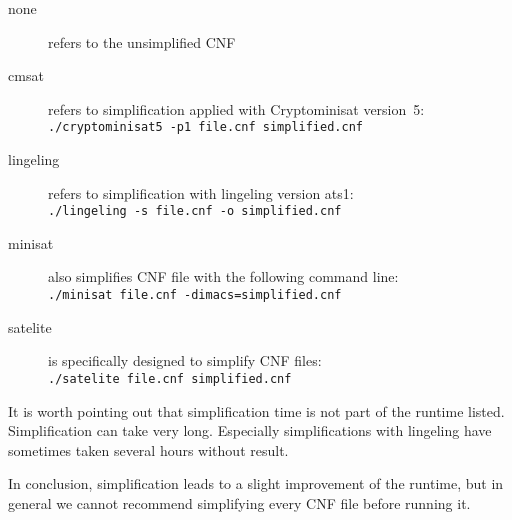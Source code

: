 \begin{description}
\item[none]
  refers to the unsimplified CNF
\item[cmsat]
  refers to simplification applied with Cryptominisat version~5: \\
  \texttt{./cryptominisat5 -p1 file.cnf simplified.cnf}
\item[lingeling]
  refers to simplification with lingeling version ats1: \\
  \texttt{./lingeling -s file.cnf -o simplified.cnf}
\item[minisat]
  also simplifies CNF file with the following command line: \\
  \texttt{./minisat file.cnf -dimacs=simplified.cnf}
\item[satelite]
  is specifically designed to simplify CNF files: \\
  \texttt{./satelite file.cnf simplified.cnf}
\end{description}

It is worth pointing out that simplification time is not part of the runtime
listed. Simplification can take very long. Especially simplifications with
lingeling have sometimes taken several hours without result.

In conclusion, simplification leads to a slight improvement of the runtime,
but in general we cannot recommend simplifying every CNF file before running it.


